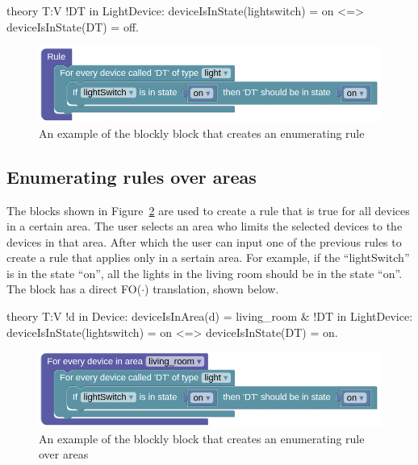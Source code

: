 \documentclass[11pt,a4paper]{report}
\newcommand{\fodot}{FO($\cdot$)\xspace}
\begin{document}
\begin{idplisting}
theory T:V {
    !DT in LightDevice: deviceIsInState(lightswitch) = on <=> deviceIsInState(DT) = off.
}
\end{idplisting}

\begin{figure}
    \centering
    \includegraphics[width=0.8\linewidth]{images/homy_enumerate_rule_devicetype.png}
    \caption{An example of the blockly block that creates an enumerating rule}
    \label{fig:homy_enumerate_rule_devicetype}
\end{figure}

\subsection{Enumerating rules over areas}
The blocks shown in Figure~\ref{fig:homy_enumerate_rule_area} are used to create a rule that is true for all devices in a certain area. The user selects an area who limits the selected devices to the devices in that area. After which the user can input one of the previous rules to create a rule that applies only in a sertain area. For example, if the ``lightSwitch'' is in the state ``on'', all the lights in the living room should be in the state ``on''. The block has a direct \fodot translation, shown below.

\begin{idplisting}
theory T:V {
    !d in Device: deviceIsInArea(d) = living_room & !DT in LightDevice: deviceIsInState(lightswitch) = on <=> deviceIsInState(DT) = on.
}
\end{idplisting}

\begin{figure}
    \centering
    \includegraphics[width=0.8\linewidth]{images/homy_enumerate_rule_area.png}
    \caption{An example of the blockly block that creates an enumerating rule over areas}
    \label{fig:homy_enumerate_rule_area}
\end{figure}
\end{document}
